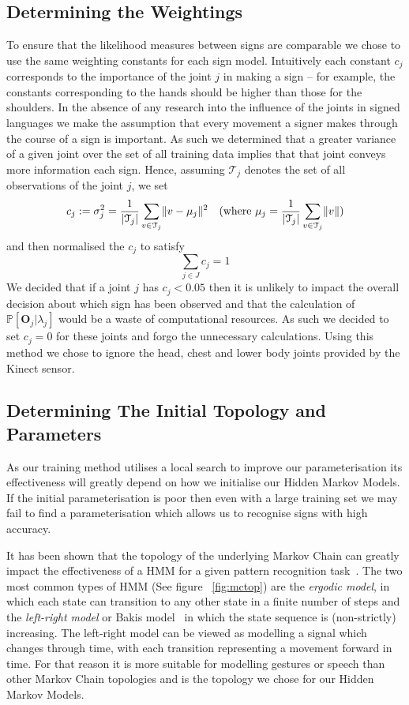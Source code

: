 \subsection{Determining the Weightings}
To ensure that the likelihood measures between signs are comparable we chose to use the same weighting constants for each sign model. Intuitively each constant $c_j$ corresponds to the importance of the joint $j$ in making a sign -- for example, the constants corresponding to the hands should be higher than those for the shoulders. In the absence of any research into the influence of the joints in signed languages we make the assumption that every movement a signer makes through the course of a sign is important. As such we determined that a greater variance of a given joint over the set of all training data implies that that joint conveys more information each sign. Hence, assuming $\mathcal{T}_j$ denotes the set of all observations of the joint $j$, we set
\begin{align*}
c_j := \sigma^2_j &= \frac{1}{\lvert\mathcal{T}_j\rvert}\sum_{v \in \mathcal{T}_j} \lVert v - \mu_j\rVert^2 &(\text{where } \mu_j = \frac{1}{\lvert\mathcal{T}_j\rvert}\sum_{v \in\mathcal{T}_j}\lVert v\rVert)
\end{align*}
and then normalised the $c_j$ to satisfy
\begin{equation*}
\sum_{j \in J} c_j = 1
\end{equation*}
We decided that if a joint $j$ has $c_j < 0.05$ then it is unlikely  to impact the overall decision about which sign has been observed and that the calculation of $\mathbb{P}[\mathbf{O}_j | \lambda_j]$ would be a waste of computational resources. As such we decided to set $c_j = 0$ for these joints and forgo the unnecessary calculations. Using this method we chose to ignore the head, chest and lower body joints provided by the Kinect sensor.

\subsection{Determining The Initial Topology and Parameters}
As our training method utilises a local search to improve our parameterisation its effectiveness will greatly depend on how we initialise our Hidden Markov Models. If the initial parameterisation is poor then even with a large training set we may fail to find a parameterisation which allows us to recognise signs with high accuracy.

It has been shown that the topology of the underlying Markov Chain can greatly impact the effectiveness of a HMM for a given pattern recognition task~\citep{rabiner1989tutorial, jelinek1998statistical}. The two most common types of HMM (See figure ~\ref{fig:mctop}) are the \emph{ergodic model}, in which each state can transition to any other state in a finite number of steps and the \emph{left-right model} or Bakis model~\citep{bakis1976continuous} in which the state sequence is (non-strictly) increasing. The left-right model can be viewed as modelling a signal which changes through time, with each transition representing a movement forward in time. For that reason it is more suitable for modelling gestures or speech than other Markov Chain topologies and is the topology we chose for our Hidden Markov Models.

